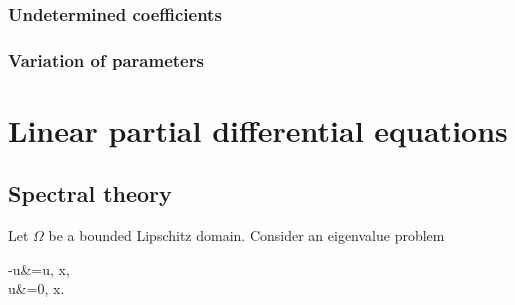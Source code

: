 \documentclass{../prb}
\begin{document}
\subsection{Undetermined coefficients}

\subsection{Variation of parameters}




\chapter{Linear partial differential equations}

\section{Spectral theory}

\begin{prb}
Let $\Omega$ be a bounded Lipschitz domain.
Consider an eigenvalue problem
\begin{pde*}
-\Delta u&=\lambda u, \: x\in\Omega,\\
u&=0, \: x\in\bd\Omega.
\end{pde*}
\end{prb}
\end{document}
